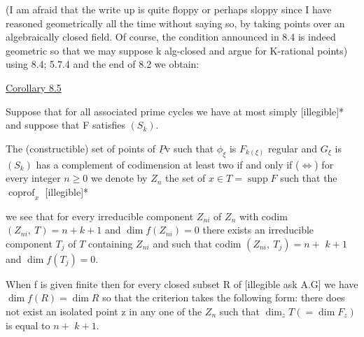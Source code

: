 
(I am afraid that the write up is quite floppy or perhaps
sloppy since I have reasoned geometrically all the time without
saying so, by taking points over an algebraically closed field.
Of course, the condition announced in 8.4 is indeed geometric so
that we may suppose k alg-closed and argue for K-rational points)
using 8.4; 5.7.4 and the end of 8.2 we obtain:

\uline{Corollary 8.5}

Suppose that for all associated prime cycles we have at most
simply [illegible]* and suppose that F satisfies $(S_k)$.

The (constructible) set of points of $\underline{P}\mathrm{v}$ such that $\phi_\xi$ is $F_{k(\xi)}$
regular and $G_\xi$ is $(S_k)$ has a complement of codimension at least two
if and only if ($\Leftrightarrow$) for every integer $n \geq 0$ we denote by $Z_n$ the set
of $x \in T = \operatorname{supp} F$ such that the $\operatorname{coprof}_x$ [illegible]*


we see that for every irreducible component $Z_{ni}$ of $Z_n$ with codim
$(Z_{ni},\ T) = n + k + 1$ and $\dim f(Z_{ni}) = 0$ there exists an irreducible
component $T_j$ of $T$ containing $Z_{ni}$ and such that codim $(Z_{ni},\ T_j) = n +$
$k + 1$ and $\dim f(T_j) = 0$.

When f is given finite then for every closed subset R of
[illegible ask A.G] we have $\dim f(R) = \dim R$ so that the criterion
takes the following form: there does not exist an isolated point
z in any one of the $Z_n$ such that $\dim_z T( = \dim F_z)$ is equal to $n +$
$k + 1$.

